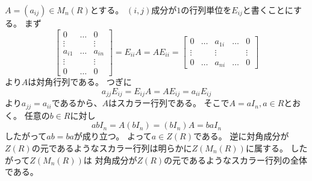 \documentclass[report]{jlreq}
\begin{document}
\begin{answer}
    $A = (a_{ij}) \in M_n(R)$とする。
    $(i, j)$成分が$1$の行列単位を$E_{ij}$と書くことにする。
    まず
    \begin{equation}
        \begin{bmatrix}
            0 & \dots & 0 \\
            \vdots & & \vdots \\
            a_{i1} & \dots & a_{in} \\
            \vdots & & \vdots \\
            0 & \dots & 0
        \end{bmatrix}
            = E_{ii} A
            = A E_{ii}
            = \begin{bmatrix}
                0 & \dots & a_{1i} & \dots & 0 \\
                \vdots & & \vdots & & \vdots \\
                0 & \dots & a_{ni} & \dots & 0
            \end{bmatrix}
    \end{equation}
    より$A$は対角行列である。
    つぎに
    \begin{equation}
        a_{jj} E_{ij} = E_{ij} A = A E_{ij} = a_{ii} E_{ij}
    \end{equation}
    より$a_{jj} = a_{ii}$であるから、$A$はスカラー行列である。
    そこで$A = a I_n, a \in R$とおく。
    任意の$b \in R$に対し
    \begin{equation}
        ab I_n = A (b I_n) = (b I_n) A = ba I_n
    \end{equation}
    したがって$ab = ba$が成り立つ。
    よって$a \in Z(R)$である。
    逆に対角成分が$Z(R)$の元であるようなスカラー行列は明らかに$Z(M_n(R))$に属する。
    したがって$Z(M_n(R))$は
    対角成分が$Z(R)$の元であるようなスカラー行列の全体である。
\end{answer}
\end{document}
